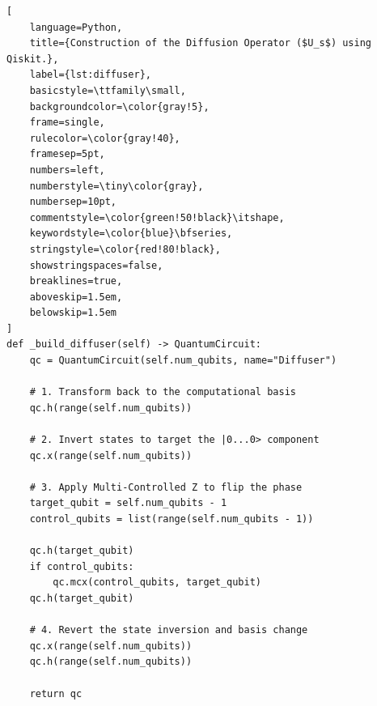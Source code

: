 \newpage
\begin{lstlisting}[
    language=Python, 
    title={Construction of the Diffusion Operator ($U_s$) using Qiskit.}, 
    label={lst:diffuser},              
    basicstyle=\ttfamily\small,    
    backgroundcolor=\color{gray!5},
    frame=single, 
    rulecolor=\color{gray!40},     
    framesep=5pt,                 
    numbers=left, 
    numberstyle=\tiny\color{gray}, 
    numbersep=10pt,                
    commentstyle=\color{green!50!black}\itshape, 
    keywordstyle=\color{blue}\bfseries, 
    stringstyle=\color{red!80!black},
    showstringspaces=false,
    breaklines=true,
    aboveskip=1.5em,              
    belowskip=1.5em                
]
def _build_diffuser(self) -> QuantumCircuit:
    qc = QuantumCircuit(self.num_qubits, name="Diffuser")

    # 1. Transform back to the computational basis
    qc.h(range(self.num_qubits))
    
    # 2. Invert states to target the |0...0> component
    qc.x(range(self.num_qubits))

    # 3. Apply Multi-Controlled Z to flip the phase
    target_qubit = self.num_qubits - 1
    control_qubits = list(range(self.num_qubits - 1))
    
    qc.h(target_qubit)
    if control_qubits:
        qc.mcx(control_qubits, target_qubit)
    qc.h(target_qubit)

    # 4. Revert the state inversion and basis change
    qc.x(range(self.num_qubits))
    qc.h(range(self.num_qubits))

    return qc
\end{lstlisting}